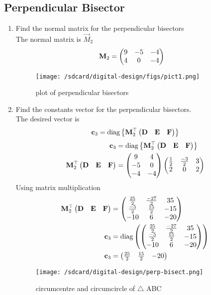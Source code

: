 \documentclass[11pt]{book}
\begin{document}
\subsection{Perpendicular Bisector}

  
\begin{enumerate}[label=\thesubsection.\arabic*.,ref=\thesubsection.\theenumi]
\item Find the normal matrix for the perpendicular bisectors \\
\solution The normal matrix is $\vec{M}_2$
\begin{align}
       \mathbf{M}_2 &=\begin{pmatrix}9 & -5 & -4 \\ 4 & 0 & -4\end{pmatrix}
\end{align}
\begin{figure}[H]
    \centering
    \texttt{[image: /sdcard/digital-design/figs/pict1.png]}
    \caption{plot of perpendicular bisectors}
    \label{fig:mat_perp1}
\end{figure}
\item Find the constants vector for the perpendicular bisectors. \\
\solution The desired vector is 
\begin{align}
\mathbf{c}_3 = \text{diag}\left\{\mathbf{M}_2^{\top}\begin{pmatrix}\mathbf{D} & \mathbf{E} &\mathbf{F}\end{pmatrix}\right\}
\end{align}
\solution
\begin{align}
\mathbf{c}_3 &= \text{diag}\left\{\mathbf{M}_2^{\top}\begin{pmatrix}\mathbf{D} & \mathbf{E} &\mathbf{F}\end{pmatrix}\right\} \\
\mathbf{M}_2^{\top}\begin{pmatrix}\mathbf{D} & \mathbf{E} &\mathbf{F}\end{pmatrix} &= \begin{pmatrix}9&4 \\ -5&0 \\ -4 &-4\end{pmatrix}\begin{pmatrix}\frac{1}{2} & \frac{-3}{2} & 3 \\ 2 & 0 & 2\end{pmatrix} \\
\end{align}
Using matrix multiplication
\begin{align}
 \mathbf{M}_2^{\top}\begin{pmatrix}\mathbf{D} & \mathbf{E} &\mathbf{F}\end{pmatrix} &=\begin{pmatrix} \frac{25}{2} & \frac{-27}{2} & 35 \\ \frac{-5}{2} & \frac{15}{2} & -15 \\ -10 & 6 & -20 \end{pmatrix} \\
    \mathbf{c}_3 &= \text{diag}\left( \begin{pmatrix} \frac{25}{2} & \frac{-27}{2} & 35 \\ \frac{-5}{2} & \frac{15}{2} & -15 \\ -10 & 6 & -20 \end{pmatrix}   \right) \\
 \mathbf{c}_3   &= \begin{pmatrix} \frac{25}{2} & \frac{15}{2} & -20\end{pmatrix}
\end{align}
\begin{figure}[H]
    \centering
    \texttt{[image: /sdcard/digital-design/perp-bisect.png]}
    \caption{circumcentre and circumcircle of $\triangle$ ABC}
    \label{fig:mat_perp2}
\end{figure}
\end{enumerate}
\end{document}
